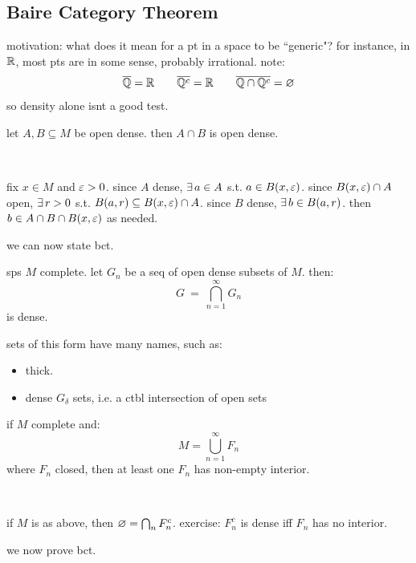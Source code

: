 \subsection{Baire Category Theorem}

motivation: what does it mean for a pt in a space to be ``generic"?
for instance, in $\mathbb{R}$, most pts are in some sense, probably irrational.
note:
\begin{equation*}
	\overline{\mathbb{Q}}=\mathbb{R} \qquad \overline{\mathbb{Q}^{c}}=\mathbb{R} \qquad \overline{\mathbb{Q}\cap\mathbb{Q}^{c}}=\varnothing
\end{equation*}
so density alone isnt a good test.

\begin{lm}
	let $A,B\subseteq M$ be open dense. then $A\cap B$ is open dense.
\end{lm} \

\begin{pf}[source=Primary Source Material]
	fix $x\in M$ and $\varepsilon>0$.
	since $A$ dense, $\ex a\in A$ s.t. $a\in B(x,\varepsilon)$.
	since $B(x,\varepsilon)\cap A$ open, $\ex r>0$ s.t. $B(a,r)\subseteq B(x,\varepsilon)\cap A$.
	since $B$ dense, $\ex b\in B(a,r)$.
	then $b\in A\cap B\cap B(x,\varepsilon)$ as needed.
\end{pf}
we can now state bct.

\begin{thm}[title=Baire Category Theorem]
	sps $M$ complete. let $G_{n}$ be a seq of open dense subsets of $M$. then:
	\begin{equation*}
		G \ = \ \bigcap_{n=1}^{\infty}G_{n}
	\end{equation*}
	is dense.
\end{thm}
sets of this form have many names, such as:
\begin{itemize}
	\item thick.
	\item dense $G_{\delta}$ sets, i.e. a ctbl intersection of open sets
\end{itemize}

\begin{crll}
	if $M$ complete and:
	\begin{equation*}
		M=\bigcup_{n=1}^{\infty}F_{n}
	\end{equation*}
	where $F_{n}$ closed, then at least one $F_{n}$ has non-empty interior.
\end{crll} \

\begin{pf}[source=Primary Source Material]
	if $M$ is as above, then $\varnothing=\bigcap_{n}F_{n}^{c}$.
	exercise: $F_{n}^{c}$ is dense iff $F_{n}$ has no interior.
\end{pf}
we now prove bct.

